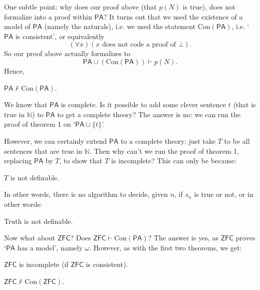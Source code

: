 \documentclass[12pt]{article}
\begin{document}
One subtle point: why does our proof above (that $p(N)$ is true), does not formalize into a proof within $\mathsf{PA}$? It turns out that we used the existence of a model of $\mathsf{PA}$ (namely the naturals), i.e. we used the statement $\mathrm{Con}(\mathsf{PA})$, i.e. `$\mathsf{PA}$ is consistent', or equivalently
\[
	(\forall x)(x \text{ does not code a proof of } \bot).
\]
So our proof above actually formalizes to
\[
\mathsf{PA} \cup (\mathrm{Con}(\mathsf{PA})) \vdash p(N).
\]
Hence,
\begin{theorem}
	$\mathsf{PA} \not \vdash \mathrm{Con}(\mathsf{PA})$.
\end{theorem}

We know that $\mathsf{PA}$ is complete. Is it possible to add some clever sentence $t$ (that is true in $\mathbb{N}$) to $\mathsf{PA}$ to get a complete theory? The answer is no: we can run the proof of theorem 1 on `$\mathsf{PA} \cup \{t\}$'.

However, we can certainly extend $\mathsf{PA}$ to a complete theory: just take $T$ to be all sentences that are true in $\mathbb{N}$. Then why can't we run the proof of theorem 1, replacing $\mathsf{PA}$ by $T$, to show that $T$ is incomplete? This can only be because:
\begin{theorem}
	$T$ is not definable.
\end{theorem}
In other words, there is no algorithm to decide, given $n$, if $s_n$ is true or not, or in other words:
\begin{center}
	Truth is not definable.
\end{center}

Now what about $\mathsf{ZFC}$? Does $\mathsf{ZFC} \vdash \mathrm{Con}(\mathsf{PA})$? The answer is yes, as $\mathsf{ZFC}$ proves `$\mathsf{PA}$ has a model', namely $\omega$. However, as with the first two theorems, we get:
\begin{theorem}
	$\mathsf{ZFC}$ is incomplete (if $\mathsf{ZFC}$ is consistent).
\end{theorem}
\begin{theorem}
	$\mathsf{ZFC} \not \vdash \mathrm{Con}(\mathsf{ZFC})$.
\end{theorem}



\newpage

\printindex
\end{document}
